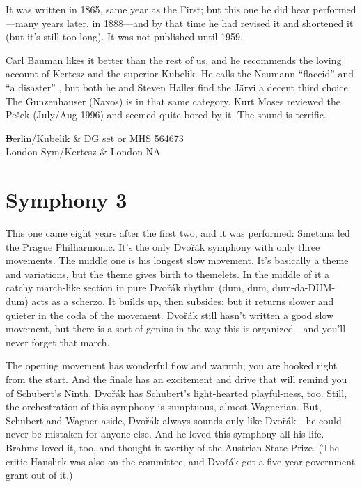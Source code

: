 \documentclass[12pt]{article}%
\begin{document}
It was written in 1865, same year as the First; but this one he did hear
performed---many years later, in 1888---and by that time he had revised it and
shortened it (but it's still too long). It was not published until 1959.

Carl Bauman likes it better than the rest of us, and he recommends the loving account of Kertesz
and the superior Kubelik. He calls the Neumann ``flaccid'' and ``a disaster'' , but both
he and Steven Haller find the Järvi a decent third choice.
The Gunzenhauser (Naxos) is in that same category. 
Kurt Moses reviewed the Pešek (July/Aug 1996) and seemed quite bored by it. The sound is terrific.

\st
Berlin/Kubelik & DG set or MHS 564673\\
London Sym/Kertesz & London NA
\et


\section{Symphony 3}

This one came eight years after the first two, and it was performed: Smetana led
the Prague Philharmonic. It's the only Dvořák symphony with only three movements. 
The middle one is his longest slow movement. It's basically a theme and variations,
but the theme gives birth to themelets. In the middle of it a catchy march-like
section in pure Dvořák rhythm (dum, dum, dum-da-DUM-dum) acts as a scherzo.
It builds up, then subsides; but it returns slower and quieter in the coda
of the movement. Dvořák still hasn't written a good slow movement, 
but there is a sort of genius in the way this is organized---and you'll never forget that march.

The opening movement has wonderful flow and warmth; you are hooked right from the start. And the finale has an excitement and drive that will remind you of Schubert's Ninth.
Dvořák has Schubert's light-hearted playful-ness, too. Still, the orchestration of this symphony is sumptuous, almost Wagnerian. But, Schubert and Wagner aside, Dvořák always sounds only like Dvořák---he could never be mistaken for anyone else. And he loved this symphony all his life. Brahms loved it, too, and thought it worthy of the Austrian State Prize.
(The critic Hanslick was also on the committee, and Dvořák got a five-year government grant out of it.)
\end{document}

